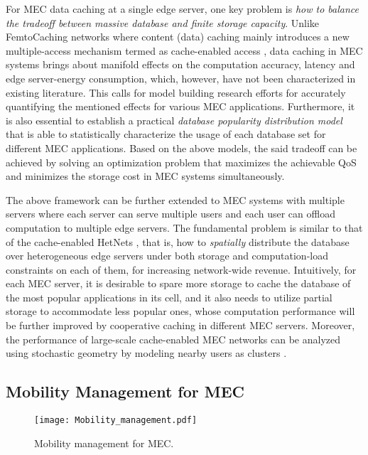 \documentclass[journal]{IEEEtran}
\begin{document}
{For MEC data caching at a single edge server, one key problem is \emph{how to balance the tradeoff between massive database and finite storage capacity}. Unlike FemtoCaching networks where content (data) caching mainly introduces a new multiple-access mechanism termed as cache-enabled access \cite{bacstu2015cache}, data caching in MEC systems brings about manifold effects on the computation accuracy, latency and edge server-energy consumption, which, however, have not been characterized in existing literature. This calls for model building research efforts for accurately quantifying the mentioned effects for various MEC applications. Furthermore, it is also essential to establish a practical \emph{database popularity distribution model} that is able to statistically characterize the usage of each database set for different MEC applications. Based on the above models, the said tradeoff can be achieved by solving an optimization problem that maximizes the achievable QoS and minimizes the storage cost in MEC systems simultaneously.

The above framework can be further extended to MEC systems with multiple servers where each server can serve multiple users and each user can offload computation to multiple edge servers. The fundamental problem is similar to that of the cache-enabled HetNets \cite{cui2015analysis}, that is, how to \emph{spatially} distribute the database over heterogeneous edge servers under both storage and computation-load constraints on each of them, for increasing network-wide revenue. Intuitively, for each MEC server, it is desirable to spare more storage to cache the database of the most popular applications in its cell, and it also needs to utilize partial storage to accommodate less popular ones, whose computation performance will be further improved by cooperative caching in different MEC servers. Moreover, the performance of large-scale cache-enabled MEC networks can be analyzed using stochastic geometry by modeling nearby users as clusters \cite{suryaprakash2015modeling}.

\subsection{Mobility Management for MEC}
\begin{figure*}[!t]
\begin{center}
   \texttt{[image: Mobility\_management.pdf]}
\end{center}
\caption{Mobility management for MEC.}
\label{Mobility_management}
\end{figure*}

}
\end{document}
